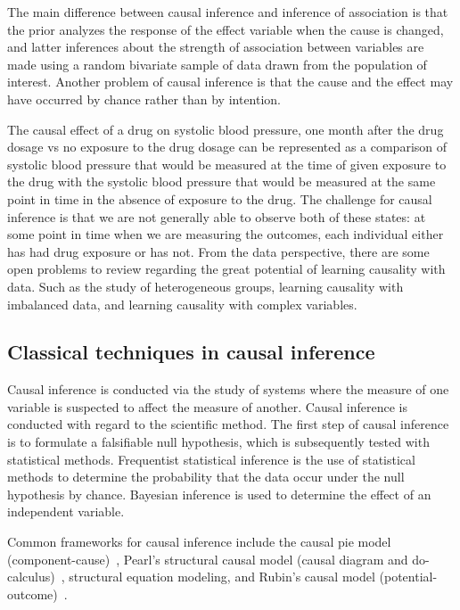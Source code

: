 \documentclass[%
 aps,
 jmp,%
 amsmath,amssymb,
 reprint,%
]{revtex4-2}
\begin{document}
The main difference between causal inference and inference of association is that the prior analyzes the response of the effect variable when the cause is changed, and latter inferences about the strength of association between variables are made using a random bivariate sample of data drawn from the population of interest. 
Another problem of causal inference is that the cause and the effect may have occurred by chance rather than by intention.

The causal effect of a drug on systolic blood pressure, one month after the drug dosage vs no exposure to the drug dosage can be represented as a comparison of systolic blood pressure that would be measured at the time of given exposure to the drug with the systolic blood pressure that would be measured at the same point in time in the absence of exposure to the drug.
The challenge for causal inference is that we are not generally able to observe both of these states: at some point in time when we are measuring the outcomes, each individual either has had drug exposure or has not.
From the data perspective, there are some open problems to review regarding the great potential of learning causality with data. 
Such as the study of heterogeneous groups, learning causality with imbalanced data, and learning causality with complex variables. 

\subsection{Classical techniques in causal inference}


Causal inference is conducted via the study of systems where the measure of one variable is suspected to affect the measure of another. 
Causal inference is conducted with regard to the scientific method. 
The first step of causal inference is to formulate a falsifiable null hypothesis, which is subsequently tested with statistical methods.
Frequentist statistical inference is the use of statistical methods to determine the probability that the data occur under the null hypothesis by chance.
Bayesian inference is used to determine the effect of an independent variable.

Common frameworks for causal inference include the causal pie model (component-cause)~\cite{rothman2005causation}, Pearl's structural causal model (causal diagram and do-calculus)~\cite{pearl2000models}, structural equation modeling, and Rubin's causal model (potential-outcome)~\cite{imbens2015causal}.
\end{document}
